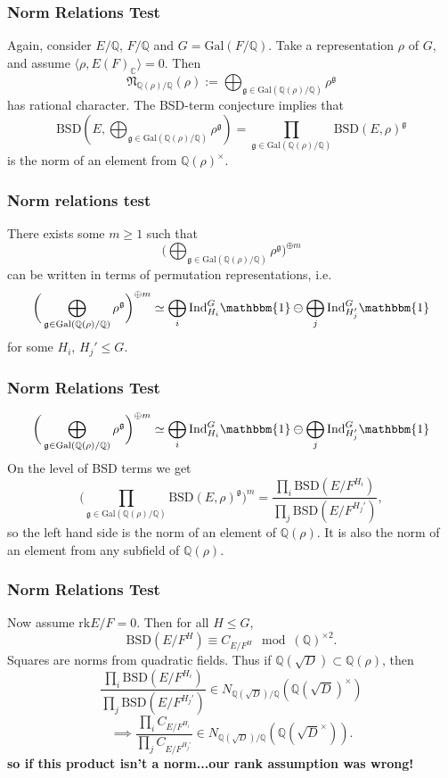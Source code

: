 \documentclass{beamer}
\newcommand{\Gal}{\mathrm{Gal}}
\newcommand{\BSD}{\mathrm{BSD}}
\newcommand{\rk}{\mathrm{rk}}
\newcommand{\trivial}{\mathbbm{1}}
\newcommand{\Ind}{\mathrm{Ind}}
\newcommand{\fg}{\mathfrak{g}}
\newcommand{\bQ}{\mathbb{Q}}
\newcommand{\bC}{\mathbb{C}}
\newcommand{\fN}{\mathfrak{N}}
\newcommand{\repnorm}[1]{\fN_{\bQ(#1) / \bQ}(#1)}
\theoremstyle{plain}
\begin{document}

\begin{frame}
    \frametitle{Norm Relations Test}
    Again, consider $E/ \bQ$, $F / \bQ$ and $G = \Gal(F / \bQ)$. \pause Take a representation $\rho$ of $G$, and assume $\langle \rho, E(F)_{\bC} \rangle = 0$. Then 
    $$ \repnorm{\rho} := \bigoplus_{\fg \in \Gal(\bQ(\rho) / \bQ)} \rho^{\fg}$$
    has rational character. \pause 
    The BSD-term conjecture implies that
    $$\BSD(E, \bigoplus_{\fg \in \Gal(\bQ(\rho) / \bQ)} \rho^{\fg}) = \prod_{\fg \in \Gal(\bQ(\rho) / \bQ)} \BSD(E, \rho)^{\fg}$$\pause
    is the norm of an element from $\bQ(\rho)^{\times}$. 
\end{frame}

\begin{frame}
    \frametitle{Norm relations test}
    There exists some $m \geq 1$ such that $$\bigg(\bigoplus_{\fg \in \Gal(\bQ(\rho) / \bQ)} \rho^{\fg}\bigg)^{\oplus m}$$
    can be written in terms of permutation representations, i.e. \pause
    $$  \bigg(\bigoplus_{\fg \in \Gal(\bQ(\rho) / \bQ)} \rho^{\fg}\bigg)^{\oplus m} \simeq \bigoplus_{i} \Ind_{H_i}^G \trivial \ominus \bigoplus_{j} \Ind_{H_j'}^G \trivial$$
    for some $H_i$, $H_j' \leq G$. 
\end{frame}

\begin{frame}
    \frametitle{Norm Relations Test}
    $$\bigg(\bigoplus_{\fg \in \Gal(\bQ(\rho) / \bQ)} \rho^{\fg}\bigg)^{\oplus m} \simeq \bigoplus_{i} \Ind_{H_i}^G \trivial \ominus \bigoplus_{j} \Ind_{H_j'}^G \trivial$$ \pause
    On the level of BSD terms we get
    $$\bigg(\prod_{\fg \in \Gal(\bQ(\rho) / \bQ)} \BSD(E, \rho)^{\fg}\bigg)^m = \frac{\prod_i \BSD(E / F^{H_i})}{\prod_j \BSD(E / F^{H_j'})} ,$$
    \pause so the left hand side is the norm of an element of $\bQ(\rho)$. \pause It is also the norm of an element from any subfield of $\bQ(\rho)$. 
\end{frame}

\begin{frame}
    \frametitle{Norm Relations Test}
    Now assume $\rk E / F = 0$. Then for all $H \leq G$, 
    $$ \BSD(E / F^{H}) \equiv C_{E / F^H} \mod (\bQ)^{\times 2}.$$ \pause
    Squares are norms from quadratic fields. \pause Thus if $\bQ(\sqrt{D}) \subset \bQ(\rho)$, then 
   $$\frac{\prod_i \BSD(E / F^{H_i})}{\prod_j \BSD(E / F^{H_j'})} \in N_{\bQ(\sqrt{D}) / \bQ}(\bQ(\sqrt{D})^{\times})$$ \pause $$\implies 
   \frac{\prod_i C_{E / F^{H_i}}}{\prod_j C_{E / F^{H_j'}}} \in N_{\bQ(\sqrt{D}) / \bQ}(\bQ(\sqrt{D}^{\times})). $$\pause
   \textbf{so if this product isn't a norm...\pause our rank assumption was wrong!}
\end{frame}
\end{document}
